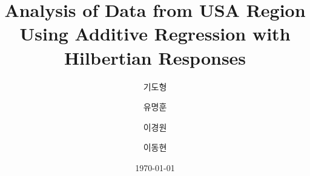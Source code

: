 \documentclass{scrartcl}
\begin{document}
\title{Analysis of Data from USA Region Using Additive Regression with Hilbertian Responses}
\author[1]{기도형}
\author[1]{유명훈}
\author[2]{이경원}
\author[2]{이동현}


\date{\today}
\maketitle








\end{document}
